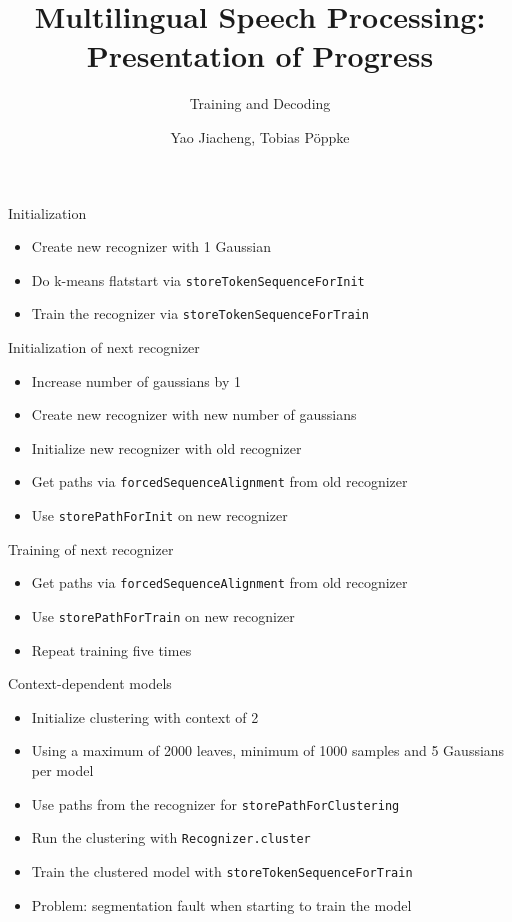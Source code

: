 \documentclass[18pt]{beamer}
\title[Course Report]{Multilingual Speech Processing:\\ Presentation of Progress}
\subtitle{Training and Decoding}
\author{Yao Jiacheng, Tobias P\"oppke}
\institute{Cognitive Systems Lab}
\begin{document}

\begin{frame}
\titlepage
\end{frame}


\begin{frame}{Initialization}
\begin{itemize}
\item Create new recognizer with 1 Gaussian
\item Do k-means flatstart via \texttt{storeTokenSequenceForInit}
\item Train the recognizer via \texttt{storeTokenSequenceForTrain}
\end{itemize}
\end{frame}

\begin{frame}{Initialization of next recognizer}
\begin{itemize}
\item Increase number of gaussians by 1
\item Create new recognizer with new number of gaussians
\item Initialize new recognizer with old recognizer
\item Get paths via \texttt{forcedSequenceAlignment} from old recognizer
\item Use \texttt{storePathForInit} on new recognizer
\end{itemize}
\end{frame}

\begin{frame}{Training of next recognizer}
\begin{itemize}
\item Get paths via \texttt{forcedSequenceAlignment} from old recognizer
\item Use \texttt{storePathForTrain} on new recognizer
\item Repeat training five times
\end{itemize}
\end{frame}

\begin{frame}{Context-dependent models}
\begin{itemize}
\item Initialize clustering with context of 2
\item Using a maximum of 2000 leaves, minimum of 1000 samples and 5 Gaussians per model
\item Use paths from the recognizer for \texttt{storePathForClustering}
\item Run the clustering with \texttt{Recognizer.cluster}
\item Train the clustered model with \texttt{storeTokenSequenceForTrain}
\item Problem: segmentation fault when starting to train the model
\end{itemize}
\end{frame}
\end{document}
